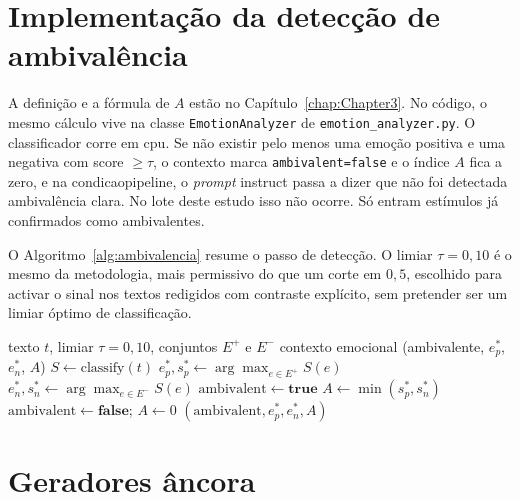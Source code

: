 
\section{Implementação da detecção de ambivalência}
\label{sec:impl_deteccao}

A definição e a fórmula de \(A\) estão no Capítulo~\ref{chap:Chapter3}. No código, o mesmo cálculo vive na classe \texttt{EmotionAnalyzer} de \texttt{emotion\_analyzer.py}. O classificador corre em \gls{cpu}. Se não existir pelo menos uma emoção positiva e uma negativa com score \(\ge \tau\), o contexto marca \texttt{ambivalent=false} e o índice \(A\) fica a zero, e na \gls{condicaopipeline}, o \textit{prompt} instruct passa a dizer que não foi detectada ambivalência clara. No lote deste estudo isso não ocorre. Só entram estímulos já confirmados como ambivalentes.

O Algoritmo~\ref{alg:ambivalencia} resume o passo de detecção. O limiar \(\tau = 0{,}10\) é o mesmo da metodologia, mais permissivo do que um corte em \(0{,}5\), escolhido para activar o sinal nos textos redigidos com contraste explícito, sem pretender ser um limiar óptimo de classificação.

\begin{algorithm}[ht]
\caption{Derivação do sinal de ambivalência a partir do \mbox{GoEmotions}.}
\label{alg:ambivalencia}
\begin{algorithmic}[1]
\Require texto \(t\), limiar \(\tau = 0{,}10\), conjuntos \(E^+\) e \(E^-\)
\Ensure contexto emocional (ambivalente, \(e_p^\ast\), \(e_n^\ast\), \(A\))
\State \(S \gets \mathrm{classify}(t)\) 
\State \(e_p^\ast, s_p^\ast \gets \arg\max_{e \in E^+} S(e)\)
\State \(e_n^\ast, s_n^\ast \gets \arg\max_{e \in E^-} S(e)\)
  \State \(\mathrm{ambivalent} \gets \mathbf{true}\)
  \State \(A \gets \min(s_p^\ast, s_n^\ast)\)
\Else
  \State \(\mathrm{ambivalent} \gets \mathbf{false}\); \(A \gets 0\)
\EndIf
\State \Return \((\mathrm{ambivalent}, e_p^\ast, e_n^\ast, A)\)
\end{algorithmic}
\end{algorithm}


\section{Geradores âncora}
\label{sec:impl_modelos}

